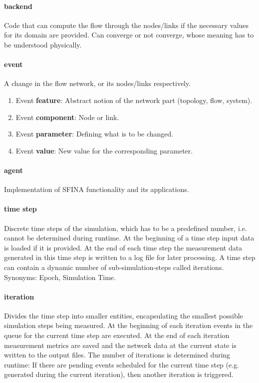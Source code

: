 \documentclass[11pt,fleqn]{book} %
\newcommand{\backend}[1][]{backend#1}
\newcommand{\domain}[1][]{domain#1}
\begin{document}
\paragraph{\backend{}}\index{\backend{}}
Code that can compute the flow through the nodes/links if the necessary values for its \domain{} are provided. Can converge or not converge, whose meaning has to be understood physically.

\paragraph{event}
A change in the flow network, or its nodes/links respectively.
\begin{enumerate}
	\item Event \textbf{feature}: Abstract notion of the network part (topology, flow, system).
	\item Event \textbf{component}: Node or link.
	\item Event \textbf{parameter}: Defining what is to be changed.
	\item Event \textbf{value}: New value for the corresponding parameter.
\end{enumerate}

\paragraph{agent}
Implementation of SFINA functionality and its applications.

\paragraph{time step}
Discrete time steps of the simulation, which has to be a predefined number, i.e. cannot be determined during runtime. At the beginning of a time step input data is loaded if it is provided. At the end of each time step the measurement data generated in this time step is written to a log file for later processing. A time step can contain a dynamic number of sub-simulation-steps called iterations. Synonyms: Epoch, Simulation Time.

\paragraph{iteration}
Divides the time step into smaller entities, encapsulating the smallest possible simulation steps being measured. At the beginning of each iteration events in the queue for the current time step are executed. At the end of each iteration measurement metrics are saved and the network data at the current state is written to the output files. The number of iterations is determined during runtime: If there are pending events scheduled for the current time step (e.g. generated during the current iteration), then another iteration is triggered.
\end{document}
